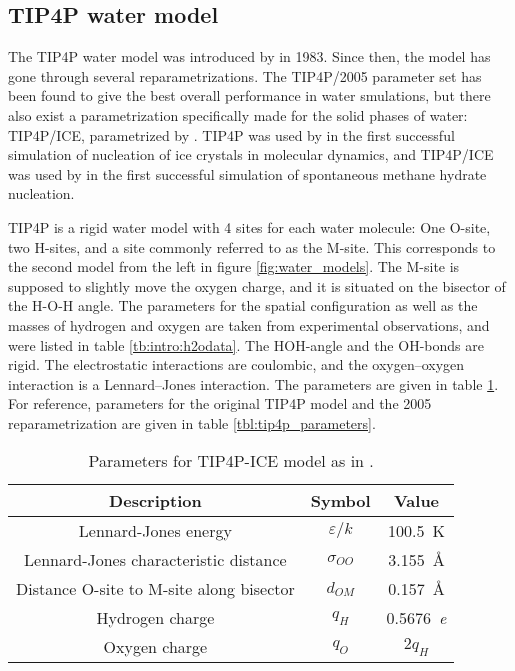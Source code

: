 \subsection{TIP4P water model}
The TIP4P water model was introduced by \citet{Jorgensen1983} in 1983. Since then, the model has gone through several reparametrizations. The TIP4P/2005 parameter set has been found to give the best overall performance in water smulations, but there also exist a parametrization specifically made for the solid phases of water: TIP4P/ICE, parametrized by \citet{Abascal2005}. TIP4P was used by \citet{Matsumoto2002} in the first successful simulation of nucleation of ice crystals in molecular dynamics, and TIP4P/ICE was used by \citet{Walsh2009} in the first successful simulation of spontaneous methane hydrate nucleation. 

TIP4P is a rigid water model with 4 sites for each water molecule: One O-site, two H-sites, and a site commonly referred to as the M-site. This corresponds to the second model from the left in figure \ref{fig:water_models}. The M-site is supposed to slightly move the oxygen charge, and it is situated on the bisector of the H-O-H angle. The parameters for the spatial configuration as well as the masses of hydrogen and oxygen are taken from experimental observations, and were listed in table \ref{tb:intro:h2odata}. The HOH-angle and the OH-bonds are rigid. The electrostatic interactions are coulombic, and the oxygen--oxygen interaction is a Lennard--Jones interaction. The parameters are given in table \ref{tbl:tip4p_ice}. For reference, parameters for the original TIP4P model and the 2005 reparametrization are given in table \ref{tbl:tip4p_parameters}.

\begin{table}[h!tb]
\caption{Parameters for TIP4P-ICE model as in \cite{Abascal2005}.}
\label{tbl:tip4p_ice}
\begin{center}
\begin{tabular}{c|c|c}
Description & Symbol & Value \\ 
\hline
Lennard-Jones energy & $\varepsilon/k$ & \SI{100.5}{\kelvin} \\
Lennard-Jones characteristic distance & $\sigma_{OO}$ & \SI{3.155}{\angstrom} \\
Distance O-site to M-site along bisector & $d_{OM}$ & \SI{0.157}{\angstrom} \\
Hydrogen charge & $q_H$ & \SI{0.5676}{\elementarycharge} \\
Oxygen charge & $q_O$ & $2q_H$ 
\end{tabular}
\end{center}
\end{table}

